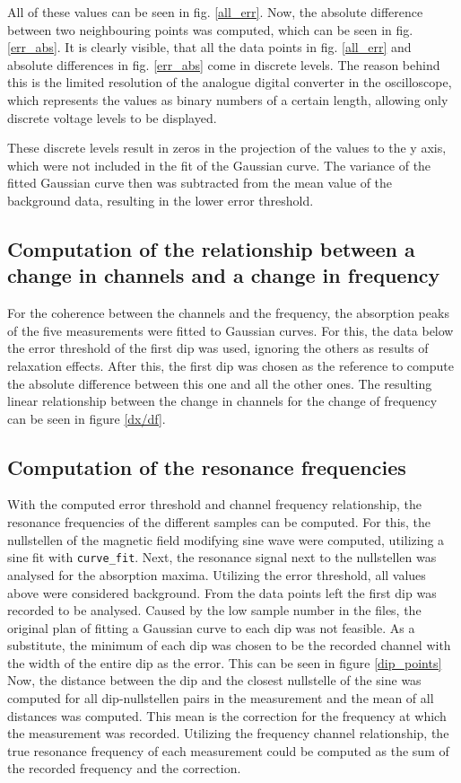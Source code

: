 All of these values can be seen in fig. \ref{all_err}. Now, the absolute difference between two neighbouring points was computed, which can be seen in fig. \ref{err_abs}. It is clearly visible, that all the data points in fig. \ref{all_err} and absolute differences in fig. \ref{err_abs} come in discrete levels. The reason behind this is the limited resolution of the analogue digital converter in the oscilloscope, which represents the values as binary numbers of a certain length, allowing only discrete voltage levels to be displayed. \par
These discrete levels result in zeros in the projection of the values to the y axis, which were not included in the fit of the Gaussian curve. 
The variance of the fitted Gaussian curve then was subtracted from the mean value of the background data, resulting in the lower error threshold.

\subsection{Computation of the relationship between a change in channels and a change in frequency}
For the coherence between the channels and the frequency, the absorption peaks of the five measurements were fitted to Gaussian curves. For this, the data below the error threshold of the first dip was used, ignoring the others as results of relaxation effects. After this, the first dip was chosen as the reference to compute the absolute difference between this one and all the other ones. 
The resulting linear relationship between the change in channels for the change of frequency can be seen in figure \ref{dx/df}.

\subsection{Computation of the resonance frequencies}
With the computed error threshold and channel frequency relationship, the resonance frequencies of the different samples can be computed.
For this, the nullstellen of the magnetic field modifying sine wave were computed, utilizing a sine fit with \verb|curve_fit|. Next, the resonance signal next to the nullstellen was analysed for the absorption maxima. Utilizing the error threshold, all values above were considered background. From the data points left the first dip was recorded to be analysed. Caused by the low sample number in the files, the original plan of fitting a Gaussian curve to each dip was not feasible. As a substitute, the minimum of each dip was chosen to be the recorded channel with the width of the entire dip as the error. This can be seen in figure \ref{dip_points}
Now, the distance between the dip and the closest nullstelle of the sine was computed for all dip-nullstellen pairs in the measurement and the mean of all distances was computed. This mean is the correction  for the frequency at which the measurement was recorded. Utilizing the frequency channel relationship, the true resonance frequency of each measurement could be computed as the sum of the recorded frequency and the correction.


